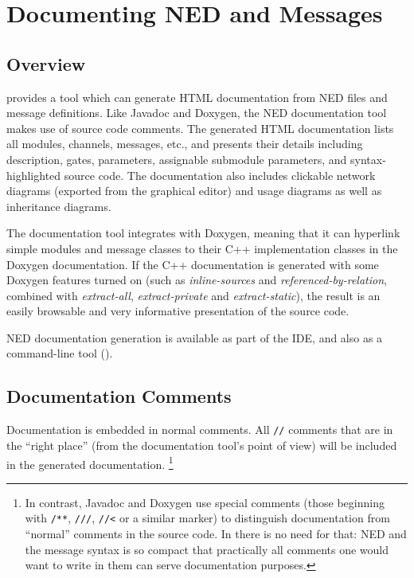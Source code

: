 \chapter{Documenting NED and Messages}
\label{cha:neddoc}

\section{Overview}
\label{sec:neddoc:overview}

{\opp} provides a tool which can generate HTML documentation from NED files
and message definitions. Like Javadoc and Doxygen, the NED documentation tool
makes use of source code comments. The generated HTML documentation
lists all modules, channels, messages, etc., and presents their details including
description, gates, parameters, assignable submodule parameters, and
syntax-highlighted source code. The documentation also includes clickable
network diagrams (exported from the graphical editor) and usage diagrams as
well as inheritance diagrams.

The documentation tool integrates with Doxygen, meaning that it can
hyperlink simple modules and message classes to their C++ implementation
classes in the Doxygen documentation. If the C++ documentation is generated
with some Doxygen features turned on (such as \textit{inline-sources} and
\textit{referenced-by-relation}, combined with \textit{extract-all},
\textit{extract-private} and \textit{extract-static}), the result is an
easily browsable and very informative presentation of the source code.

NED documentation generation is available as part of the {\opp} IDE, and
also as a command-line tool ().


\section{Documentation Comments}
\label{sec:neddoc:documentation-comments}

Documentation is embedded in normal comments. All \texttt{//} comments
that are in the ``right place'' (from the documentation tool's
point of view) will be included in the generated documentation.
  \footnote{In contrast, Javadoc and Doxygen use special comments (those
     beginning with \texttt{/**}, \texttt{///}, \texttt{//<} or a similar
     marker) to distinguish documentation from ``normal'' comments in the
     source code. In {\opp} there is no need for that: NED and the message
     syntax is so compact that practically all comments one would want to write
     in them can serve documentation purposes.}

